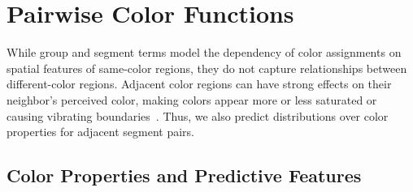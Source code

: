 \section{Pairwise Color Functions}
\label{sec:binary}

While group and segment terms model the dependency of color assignments on spatial features of same-color regions, they do not capture relationships between different-color regions. Adjacent color regions can have strong effects on their neighbor's perceived color, making colors appear more or less saturated or causing vibrating boundaries~\cite{AlbersInteractionOfColor}. Thus, we also predict distributions over color properties for adjacent segment pairs.

\subsection{Color Properties and Predictive Features}
\label{sec:binaryPropsAndFeatures}


